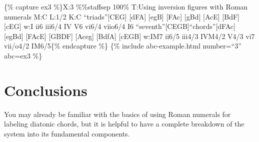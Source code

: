 \documentclass{book}
\begin{document}
\{\% capture ex3 \%\}X:3 \%\%staffsep 100\% T:Using inversion figures with
Roman numerals M:C L:1/2 K:C ``triads''{[}CEG{]} {[}dFA{]}\textbar{} {[}egB{]}
{[}FAc{]}\textbar{} {[}gBd{]} {[}AcE{]}\textbar{} {[}BdF{]}
{[}cEG{]}\textbar\textbar{} w:I ii6 iii6/4 IV V6 vi6/4 viio6/4 I6
``seventh''{[}CEGB{]}``chords''{[}dFAc{]}\textbar{} {[}egBd{]}
{[}FAcE{]}\textbar{} {[}GBDF{]} {[}Aceg{]}\textbar{} {[}BdfA{]}
{[}cEGB{]}\textbar\textbar{} w:IM7 ii6/5 iii4/3 IVM4/2 V4/3 vi7 vii/o4/2
IM6/5\{\% endcapture \%\} \{\% include abc-example.html number=``3'' abc=ex3
\%\}

\hypertarget{conclusions-17}{%
\section{Conclusions}\label{conclusions-17}}

You may already be familiar with the basics of using Roman numerals for
labeling diatonic chords, but it is helpful to have a complete breakdown of
the system into its fundamental components.
\end{document}

